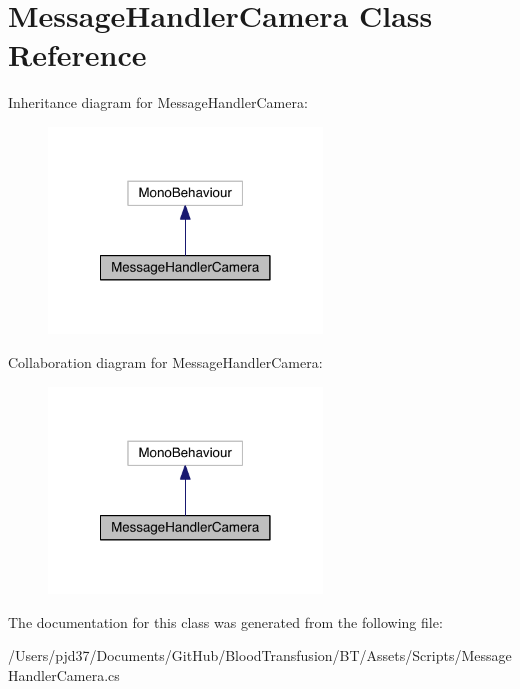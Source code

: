 \hypertarget{class_message_handler_camera}{}\section{Message\+Handler\+Camera Class Reference}
\label{class_message_handler_camera}


Inheritance diagram for Message\+Handler\+Camera\+:\nopagebreak
\begin{figure}[H]
\begin{center}
\leavevmode
\includegraphics[width=206pt]{class_message_handler_camera__inherit__graph}
\end{center}
\end{figure}


Collaboration diagram for Message\+Handler\+Camera\+:\nopagebreak
\begin{figure}[H]
\begin{center}
\leavevmode
\includegraphics[width=206pt]{class_message_handler_camera__coll__graph}
\end{center}
\end{figure}


The documentation for this class was generated from the following file\+:\begin{DoxyCompactItemize}
\item 
/\+Users/pjd37/\+Documents/\+Git\+Hub/\+Blood\+Transfusion/\+B\+T/\+Assets/\+Scripts/Message\+Handler\+Camera.\+cs\end{DoxyCompactItemize}
